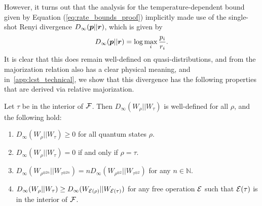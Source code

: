 \documentclass[pra,
aps,
twocolumn,
superscriptaddress,
groupedaddress,
nofootinbib,
reprint
]{revtex4-1}
\begin{document}
 
However, it turns out that the analysis for the temperature-dependent bound given by Equation (\ref{eq:rate_bounds_proof}) implicitly made use of the single-shot Renyi divergence $D_\infty (\boldsymbol{p} ||\boldsymbol{r})$, which is given by
\begin{equation}
D_\infty (\boldsymbol{p} ||\boldsymbol{r}) = \log \max_i \frac{p_i}{r_i}.
\end{equation}
It is clear that this does remain well-defined on quasi-distributions, and from the majorization relation also has a clear physical meaning, and in~\cref{app:lcst_technical}, we show that this divergence has the following properties that are derived via relative majorization.
\begin{theorem}\label{thm:Dinfty} 
	Let $\tau$ be in the interior of ${\mathcal F}$. Then $D_\infty(W_\rho || W_\tau)$ is well-defined for all $\rho$, and the following hold:
\begin{enumerate}
\item $D_\infty(W_\rho || W_\tau) \ge 0$ for all quantum states $\rho$.
\item  $D_\infty(W_\rho || W_\tau) = 0$ if and only if $\rho =\tau$.
\item $D_\infty(W_{\rho^{\otimes 2n}}|| W_{\tau^{\otimes 2n}}) = n D_\infty(W_{\rho^{\otimes 2}} ||W_{\tau^{\otimes 2}})$ for any $n \in \mathbb{N}$.
\item $D_\infty(W_\rho || W_\tau) \geq D_\infty(W_{{\mathcal E}(\rho)} || W_{{\mathcal E}(\tau)})$ for any free operation ${\mathcal E}$ such that ${\mathcal E}(\tau)$ is in the interior of ${\mathcal F}$.
\end{enumerate}
\end{theorem}
\end{document}
